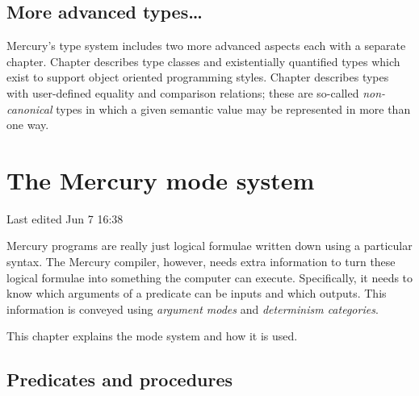 \documentclass[a4paper,11pt,notitlepage,onecolumn]{book}
\begin{document}
\section{More advanced types\ldots}

Mercury's type system includes two more advanced aspects each with a
separate chapter.  Chapter \XXX{} describes type classes and existentially
quantified types which exist to support object oriented programming styles.
Chapter \XXX{} describes types with user-defined equality and comparison
relations; these are so-called \emph{non-canonical} types in which a given
semantic value may be represented in more than one way.



\setcounter{chapter}{2}



\chapter{The Mercury mode system}

Last edited Jun 7 16:38

Mercury programs are really just logical formulae written down using a
particular syntax.  The Mercury compiler, however, needs extra information
to turn these logical formulae into something the computer can execute.
Specifically, it needs to know which arguments of a predicate 
can be inputs and which outputs.  This information is conveyed using
\emph{argument modes} and \emph{determinism categories}.

This chapter explains the mode system and how it is used.

\section{Predicates and procedures}
\end{document}
